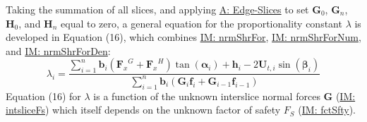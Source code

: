 \documentclass[12pt]{article}
\begin{document}
Taking the summation of all slices, and applying \hyperref[assumpES]{A: Edge-Slices} to set ${\mathbf{G}}_{0}$, ${\mathbf{G}}_{n}$, ${\mathbf{H}}_{0}$, and ${\mathbf{H}}_{n}$ equal to zero, a general equation for the proportionality constant $λ$ is developed in Equation (16), which combines \hyperref[IM:nrmShrFor]{IM: nrmShrFor}, \hyperref[IM:nrmShrForNum]{IM: nrmShrForNum}, and \hyperref[IM:nrmShrForDen]{IM: nrmShrForDen}:
\begin{displaymath}
λ_{i}=\frac{\displaystyle\sum_{i=1}^{n}{{\mathbf{b}}_{i} \left({{\mathbf{F}_{x}}^{G}}+{{\mathbf{F}_{x}}^{H}}\right) \tan\left({\mathbf{α}}_{i}\right)+{\mathbf{h}}_{i} -2 {\mathbf{U}_{t,i}} \sin\left({\mathbf{β}}_{i}\right)}}{\displaystyle\sum_{i=1}^{n}{{\mathbf{b}}_{i} \left({\mathbf{G}}_{i} {\mathbf{f}}_{i}+{\mathbf{G}}_{i-1} {\mathbf{f}}_{i-1}\right)}}
\end{displaymath}
Equation (16) for $λ$ is a function of the unknown interslice normal forces $\mathbf{G}$ (\hyperref[IM:intsliceFs]{IM: intsliceFs}) which itself depends on the unknown factor of safety ${F_{S}}$ (\hyperref[IM:fctSfty]{IM: fctSfty}).
\par~
\end{document}
